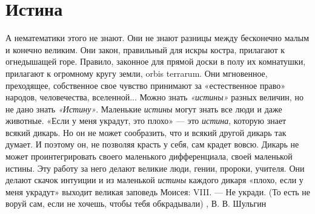  
 
 
 
 
\chapter{Истина}


А нематематики этого не знают. Они не знают разницы между бесконечно малым и
конечно великим. Они закон, правильный для искры костра, прилагают к
огнедышащей горе. Правило, законное для прямой доски в полу их комнатушки,
прилагают к огромному кругу земли, orbis terrarum. Они мгновенное,
преходящее, собственное свое чувство принимают за «естественное право» народов,
человечества, вселенной...  Можно знать \emph{«истины»} разных величин, но не
дано знать \emph{«Истину»}. Маленькие \emph{истины} могут знать все люди и даже
животные. «Если у меня украдут, это плохо» — это \emph{истина}, которую знает
всякий дикарь. Но он не может сообразить, что и всякий другой дикарь так
думает. И поэтому он, не позволяя красть у себя, сам крадет вовсю. Дикарь не
может проинтегрировать своего маленького дифференциала, своей маленькой истины.
Эту работу за него делают великие люди, гении, пророки, учителя. Они делают
скачок интуиции и из маленькой \emph{истины} каждого дикаря «плохо, если у меня
украдут» выходит великая заповедь Моисея: VIII. — Не укради. (То есть не воруй
сам, если не хочешь, чтобы тебя обкрадывали)
, В. В. Шульгин

